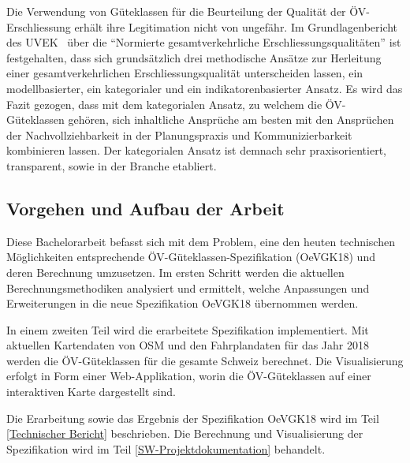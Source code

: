 Die Verwendung von Güteklassen für die Beurteilung der Qualität der \acs{ÖV}-Erschliessung erhält ihre Legitimation nicht von ungefähr.
Im Grundlagenbericht des \acs{UVEK}~\cite{grundlagenbericht_uvek} über die "`Normierte gesamtverkehrliche Erschliessungsqualitäten"' ist festgehalten, dass sich grundsätzlich drei methodische Ansätze zur Herleitung einer gesamtverkehrlichen Erschliessungsqualität unterscheiden lassen, ein modellbasierter, ein kategorialer und ein indikatorenbasierter Ansatz.
Es wird das Fazit gezogen, dass mit dem kategorialen Ansatz, zu welchem die \acs{ÖV}-Güteklassen gehören, sich inhaltliche Ansprüche am besten mit den Ansprüchen der Nachvollziehbarkeit in der Planungspraxis und Kommunizierbarkeit kombinieren lassen.
Der kategorialen Ansatz ist demnach sehr praxisorientiert, transparent, sowie in der Branche etabliert.

\subsection{Vorgehen und Aufbau der Arbeit}
\label{Einführung:Vorgehen und Aufbau der Arbeit}

Diese Bachelorarbeit befasst sich mit dem Problem, eine den heuten technischen Möglichkeiten entsprechende \acs{ÖV}-Güteklassen-Spezifikation (\gls{OeVGK18}) und deren Berechnung umzusetzen.
Im ersten Schritt werden die aktuellen Berechnungsmethodiken analysiert und ermittelt, welche Anpassungen und Erweiterungen in die neue Spezifikation \gls{OeVGK18} übernommen werden.

In einem zweiten Teil wird die erarbeitete Spezifikation implementiert.
Mit aktuellen Kartendaten von \ac{OSM} und den Fahrplandaten für das Jahr 2018 werden die \acs{ÖV}-Güteklassen für die gesamte Schweiz berechnet.
Die Visualisierung erfolgt in Form einer Web-Applikation, worin die \acs{ÖV}-Güteklassen auf einer interaktiven Karte dargestellt sind.

Die Erarbeitung sowie das Ergebnis der Spezifikation \gls{OeVGK18} wird im Teil \ref{Technischer Bericht} beschrieben.
Die Berechnung und Visualisierung der Spezifikation wird im Teil \ref{SW-Projektdokumentation} behandelt.
